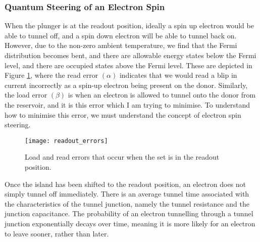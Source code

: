 	
	\subsubsection{Quantum Steering of an Electron Spin}
	
	When the plunger is at the readout position, ideally a spin up electron would be able to tunnel off, and a spin down electron will be able to tunnel back on. However, due to the non-zero ambient temperature, we find that the Fermi distribution becomes bent, and there are allowable energy states below the Fermi level, and there are occupied states above the Fermi level. These are depicted in Figure \ref{fig::errors}, where the read error $(\alpha)$ indicates that we would read a blip in current incorrectly as a spin-up electron being present on the donor. Similarly, the load error $(\beta)$ is when an electron is allowed to tunnel onto the donor from the reservoir, and it is this error which I am trying to minimise. To understand how to minimise this error, we must understand the concept of electron spin steering.
	
	\begin{figure}[htbp!]
		\centering
		\texttt{[image: readout\_errors]}
		\caption[Load and red errors in the \gls{set} readout position]{Load and read errors that occur when the \gls{set} is in the readout position.\cite{electron_spin_silicon}}
		\label{fig::errors}
	\end{figure}
	
	Once the island has been shifted to the readout position, an electron does not simply tunnel off immediately. There is an average tunnel time associated with the characteristics of the tunnel junction, namely the tunnel resistance and the junction capacitance. The probability of an electron tunnelling through a tunnel junction exponentially decays over time, meaning it is more likely for an electron to leave sooner, rather than later. \\
	
